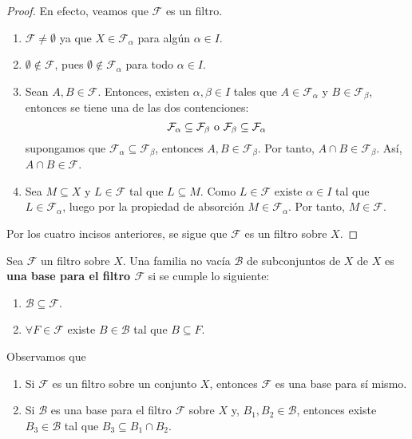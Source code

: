 \documentclass[12pt]{report}
\theoremstyle{largebreak}
\begin{document}
    \begin{proof}
        En efecto, veamos que $\mathcal{F}$ es un filtro.
        \begin{enumerate}
            \item $\mathcal{F}\neq\emptyset$ ya que $X\in\mathcal{F}_\alpha$ para algún $\alpha\in I$.
            \item $\emptyset\notin\mathcal{F}$, pues $\emptyset\notin\mathcal{F}_\alpha$ para todo $\alpha\in I$.
            \item Sean $A,B\in\mathcal{F}$. Entonces, existen $\alpha,\beta\in I$ tales que $A\in\mathcal{F}_\alpha$ y $B\in\mathcal{F}_\beta$, entonces se tiene una de las dos contenciones:
            \begin{equation*}
                \mathcal{F}_\alpha\subseteq\mathcal{F}_\beta\textup{ o }\mathcal{F}_\beta\subseteq\mathcal{F}_\alpha
            \end{equation*}
            supongamos que $\mathcal{F}_\alpha\subseteq\mathcal{F}_\beta$, entonces $A,B\in\mathcal{F}_\beta$. Por tanto, $A\cap B\in\mathcal{F}_\beta$. Así, $A\cap B\in\mathcal{F}$.
            \item Sea $M\subseteq X$ y $L\in\mathcal{F}$ tal que $L\subseteq M$. Como $L\in\mathcal{F}$ existe $\alpha\in I$ tal que $L\in\mathcal{F}_\alpha$, luego por la propiedad de absorción $M\in\mathcal{F}_\alpha$. Por tanto, $M\in\mathcal{F}$.
        \end{enumerate}
        Por los cuatro incisos anteriores, se sigue que $\mathcal{F}$ es un filtro sobre $X$.
    \end{proof}

    \begin{mydef}
        Sea $\mathcal{F}$ un filtro sobre $X$. Una familia no vacía $\mathcal{B}$ de subconjuntos de $X$ de $X$ es \textbf{una base para el filtro $\mathcal{F}$} si se cumple lo siguiente:
        \begin{enumerate}
            \item $\mathcal{B}\subseteq\mathcal{F}$.
            \item $\forall F\in\mathcal{F}$ existe $B\in\mathcal{B}$ tal que $B\subseteq F$.
        \end{enumerate}
    \end{mydef}

    \begin{obs}
        Observamos que
        \begin{enumerate}
            \item Si $\mathcal{F}$ es un filtro sobre un conjunto $X$, entonces $\mathcal{F}$ es una base para sí mismo.
            \item Si $\mathcal{B}$ es una base para el filtro $\mathcal{F}$ sobre $X$ y, $B_1,B_2\in\mathcal{B}$, entonces existe $B_3\in\mathcal{B}$ tal que $B_3\subseteq B_1\cap B_2$.
        \end{enumerate}
    \end{obs}
\end{document}
